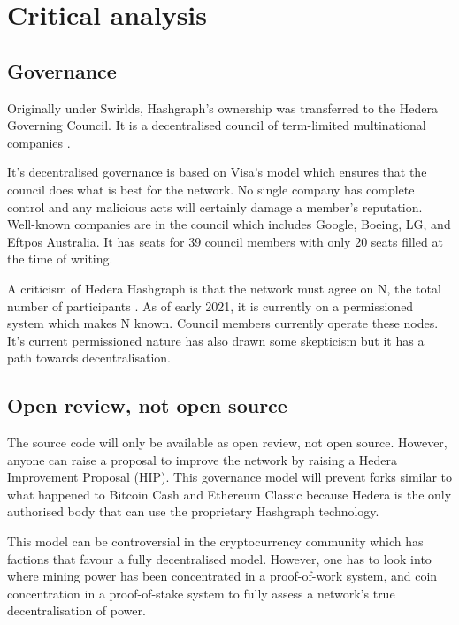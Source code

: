 \section{Critical analysis}

\subsection{Governance}
Originally under Swirlds, Hashgraph's ownership was transferred to the Hedera Governing Council. It is a decentralised council of term-limited multinational companies \cite{baird2018hedera}. 

It's decentralised governance is based on Visa's model\cite{hederacouncil} which ensures that the council does what is best for the network. No single company has complete control and any malicious acts will certainly damage a member's reputation. Well-known companies are in the council which includes Google, Boeing, LG, and Eftpos Australia. It has seats for 39 council members with only 20 seats filled at the time of writing.

A criticism of Hedera Hashgraph is that the network must agree on N, the total number of participants \cite{kauflin2018}. As of early 2021, it is currently on a permissioned system which makes N known. Council members currently operate these nodes. It's current permissioned nature has also drawn some skepticism but it has a path towards decentralisation.


\subsection{Open review, not open source}
The source code will only be available as open review, not open source. However, anyone can raise a proposal to improve the network by raising a Hedera Improvement Proposal (HIP)\cite{hip}. This governance model will prevent forks similar to what happened to Bitcoin Cash and Ethereum Classic because Hedera is the only authorised body that can use the proprietary Hashgraph technology.

This model can be controversial in the cryptocurrency community which has factions that favour a fully decentralised model. However, one has to look into where mining power has been concentrated in a proof-of-work system, and coin concentration in a proof-of-stake system to fully assess a network's true decentralisation of power.

